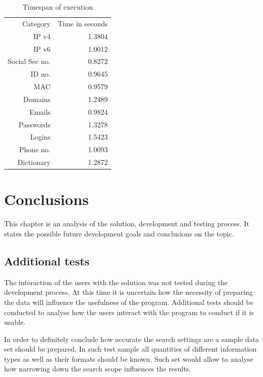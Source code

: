 \documentclass[a4paper,twoside,12pt]{book}
\begin{document}
\begin{table}
   \centering
   \caption{Timespan of execution}
   \label{id:tab:wynikiTime}
   \begin{tabular}{rr}
   \toprule
      Category       &  Time in seconds \\
      IP v4          &           1.3804 \\
      IP v6          &           1.0012 \\
      Social Sec no. &           0.8272 \\
      ID no.         &           0.9645 \\
      MAC            &           0.9579 \\
      Domains        &           1.2489 \\
      Emails         &           0.9824 \\
      Passwords      &           1.3278 \\
      Logins         &           1.5423 \\
      Phone no.      &           1.0093 \\
      Dictionary     &           1.2872 \\ 
   \bottomrule
   \end{tabular}
   \end{table}  

\chapter{Conclusions}

This chapter is an analysis of the solution, development and testing process. It states the possible future development goals and conclusions on the topic.

\section{Additional tests}

The interaction of the users with the solution was not tested during the development process.
At this time it is uncertain how the necessity of preparing the data will influence the usefulness
of the program. Additional tests should be conducted to analyse how the users interact with the
program to conduct if it is usable. 

In order to definitely conclude how accurate the search settings are a sample data set should be prepared.
In such test sample all quantities of different information types as well as their formats should be known.
Such set would allow to analyse how narrowing down the search scope influences the results.
\end{document}
